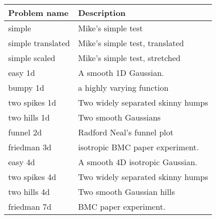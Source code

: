 \begin{table}[h!]
\label{tbl:problem_descriptions}
\begin{center}
\begin{tabular}{ll}
 Problem name & Description \ 
 \\ \midrule 
simple & Mike's simple test \\ 
simple translated & Mike's simple test, translated \\ 
simple scaled & Mike's simple test, stretched \\ 
easy 1d & A smooth 1D Gaussian. \\ 
bumpy 1d & a highly varying function \\ 
two spikes 1d & Two widely separated skinny humps \\ 
two hills 1d & Two smooth Gaussians \\ 
funnel 2d & Radford Neal's funnel plot \\ 
friedman 3d & isotropic BMC paper experiment. \\ 
easy 4d & A smooth 4D isotropic Gaussian. \\ 
two spikes 4d & Two widely separated skinny humps \\ 
two hills 4d & Two smooth Gaussian hills \\ 
friedman 7d & BMC paper experiment. \\ 
\end{tabular}
\end{center}
\end{table}
